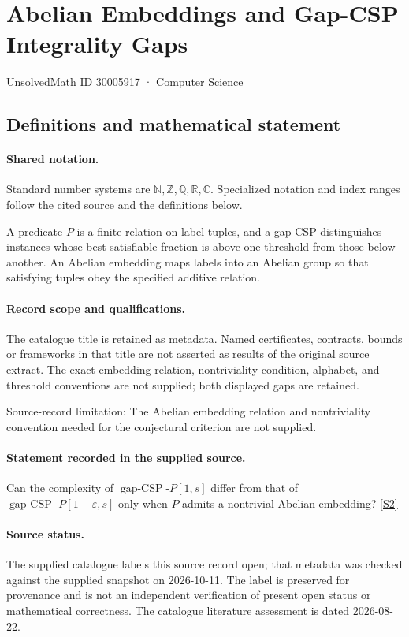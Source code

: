 \documentclass[11pt]{article}
\newcommand{\sref}[2]{\hyperlink{source:#1:#2}{[S#2]}}
\begin{document}
\setcounter{section}{30005916}
\section{Abelian Embeddings and Gap-CSP Integrality Gaps}\label{30005917}
{\small\sffamily UnsolvedMath ID 30005917 · Computer Science}
\subsection{Definitions and mathematical statement}

\paragraph{Shared notation.}Standard number systems are $\mathbb N,\mathbb Z,\mathbb Q,\mathbb R,\mathbb C$. Specialized notation and index ranges follow the cited source and the definitions below.


A predicate $P$ is a finite relation on label tuples, and a gap-CSP distinguishes instances whose best satisfiable fraction is above one threshold from those below another. An Abelian embedding maps labels into an Abelian group so that satisfying tuples obey the specified additive relation.
\paragraph{Record scope and qualifications.}
The catalogue title is retained as metadata. Named certificates, contracts, bounds or frameworks in that title are not asserted as results of the original source extract.
The exact embedding relation, nontriviality condition, alphabet, and threshold conventions are not supplied; both displayed gaps are retained.

Source-record limitation: The Abelian embedding relation and nontriviality convention needed for the conjectural criterion are not supplied.
\paragraph{Statement recorded in the supplied source.}
Can the complexity of $\operatorname{gap-CSP}\text{-}P[1,s]$ differ from that of $\operatorname{gap-CSP}\text{-}P[1-\varepsilon,s]$ only when $P$ admits a nontrivial Abelian embedding? \sref{30005917}{2}
\paragraph{Source status.}
The supplied catalogue labels this source record open; that metadata was checked against the supplied snapshot on 2026-10-11. The label is preserved for provenance and is not an independent verification of present open status or mathematical correctness. The catalogue literature assessment is dated 2026-08-22.
\end{document}
